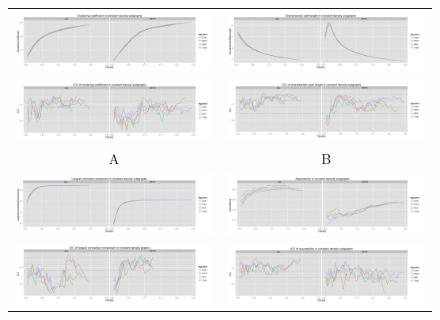 \documentclass{frontiersSCNS} %
\begin{document}
\begin{figure}
\begin{center}
\begin{tabular}{cc}
\includegraphics[width=0.5\linewidth]{figures/clust_plot.png}  & \includegraphics[width=0.5\linewidth]{figures/path_plot.png} \\
\includegraphics[width=0.5\linewidth]{figures/clust_icc_plot.png} & \includegraphics[width=0.5\linewidth]{figures/path_icc_plot.png} \\
A & B \\
\includegraphics[width=0.5\linewidth]{figures/size_plot.png}  & \includegraphics[width=0.5\linewidth]{figures/assort_plot.png} \\
\includegraphics[width=0.5\linewidth]{figures/size_icc_plot.png} & \includegraphics[width=0.5\linewidth]{figures/assort_icc_plot.png} \\

\end{tabular}
\end{center}
\end{figure}
\end{document}
